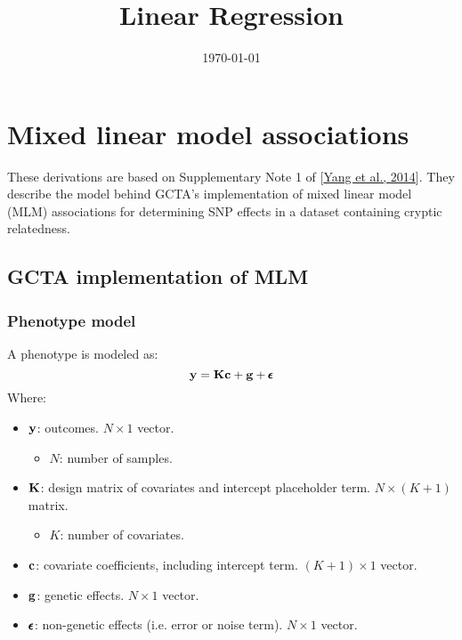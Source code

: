 \documentclass[12pt]{article}
\title{Linear Regression}
\date{\today}
\begin{document}
\maketitle

\section{Mixed linear model associations}

These derivations are based on Supplementary Note 1 of [\href{https://www.nature.com/articles/ng.2876}{Yang et al., 2014}]. They describe the model behind GCTA's implementation of mixed linear model (MLM) associations for determining SNP effects in a dataset containing cryptic relatedness.

\subsection{GCTA implementation of MLM}

\subsubsection{Phenotype model}
A phenotype is modeled as:
$$ \mathbf{y} = \mathbf{K} \mathbf{c} + \mathbf{g} + \pmb{\epsilon} $$
Where:
\begin{itemize}
    \item $\mathbf{y}$: outcomes.
    $N \times 1$ vector.
    \begin{itemize}
        \item $N$: number of samples.
    \end{itemize}
    \item $\mathbf{K}$: design matrix of covariates and intercept placeholder term.
    $N \times (K+1)$ matrix.
    \begin{itemize}
        \item $K$: number of covariates.
    \end{itemize}
    \item $\mathbf{c}$: covariate coefficients, including intercept term.
    $(K+1) \times 1$ vector.
    \item $\mathbf{g}$: genetic effects.
    $N \times 1$ vector.
    \item $\pmb{\epsilon}$: non-genetic effects (i.e. error or noise term).
    $N \times 1$ vector.
\end{itemize}
\end{document}
